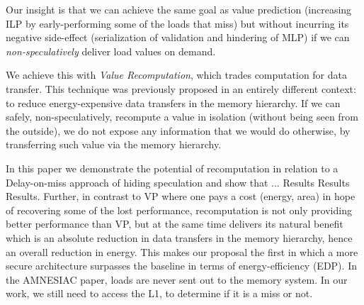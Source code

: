 Our insight is that we can achieve the same goal as value prediction (increasing ILP by early-performing some of the loads that miss) but without incurring its negative side-effect (serialization of validation and hindering of MLP) if we can \emph{non-speculatively} deliver load values on demand. 

We achieve this with \emph{Value Recomputation}, which trades computation for data transfer. This technique was previously proposed in an entirely different context: to reduce energy-expensive data transfers in the memory hierarchy. If we can safely, non-speculatively, recompute a value in isolation (without being seen from the outside), we do not expose any information that we would do otherwise, by transferring such value via the memory hierarchy.

In this paper we demonstrate the potential of recomputation in relation to a Delay-on-miss approach of hiding speculation and show that ... Results Results Results. Further, {\color{red} in contrast to VP where one pays a cost (energy, area) in hope of recovering some of the lost performance, recomputation is not only providing better performance than VP, but at the same time delivers its natural benefit which is an absolute reduction in data transfers in the memory hierarchy, hence an overall reduction in energy. This makes our proposal the first in which a more secure architecture surpasses the baseline in terms of energy-efficiency (EDP).
}{\color{blue} In the AMNESIAC paper, loads are never sent out to the memory system. In our work, we still need to access the L1, to determine if it is a miss or not.}





